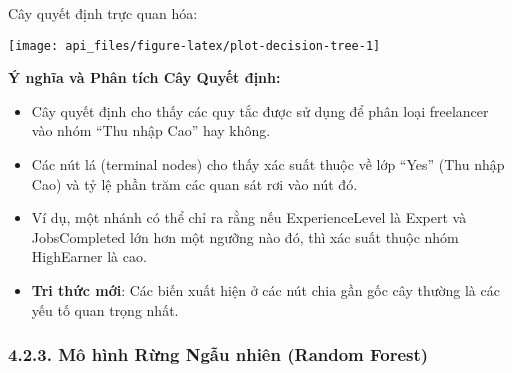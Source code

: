 \documentclass[
]{article}
\newenvironment{Shaded}{\begin{snugshade}}{\end{snugshade}}
\newcommand{\AttributeTok}[1]{\textcolor[rgb]{0.13,0.29,0.53}{#1}}
\newcommand{\CommentTok}[1]{\textcolor[rgb]{0.56,0.35,0.01}{\textit{#1}}}
\newcommand{\ConstantTok}[1]{\textcolor[rgb]{0.56,0.35,0.01}{#1}}
\newcommand{\DecValTok}[1]{\textcolor[rgb]{0.00,0.00,0.81}{#1}}
\newcommand{\FloatTok}[1]{\textcolor[rgb]{0.00,0.00,0.81}{#1}}
\newcommand{\FunctionTok}[1]{\textcolor[rgb]{0.13,0.29,0.53}{\textbf{#1}}}
\newcommand{\NormalTok}[1]{#1}
\newcommand{\SpecialCharTok}[1]{\textcolor[rgb]{0.81,0.36,0.00}{\textbf{#1}}}
\newcommand{\StringTok}[1]{\textcolor[rgb]{0.31,0.60,0.02}{#1}}
\begin{document}
Cây quyết định trực quan hóa:

\begin{Shaded}
\end{Shaded}

\begin{center}\texttt{[image: api\_files/figure-latex/plot-decision-tree-1]} \end{center}

\textbf{Ý nghĩa và Phân tích Cây Quyết định:}

\begin{itemize}
\item
  Cây quyết định cho thấy các quy tắc được sử dụng để phân loại
  freelancer vào nhóm ``Thu nhập Cao'' hay không.
\item
  Các nút lá (terminal nodes) cho thấy xác suất thuộc về lớp ``Yes''
  (Thu nhập Cao) và tỷ lệ phần trăm các quan sát rơi vào nút đó.
\item
  Ví dụ, một nhánh có thể chỉ ra rằng nếu ExperienceLevel là Expert và
  JobsCompleted lớn hơn một ngưỡng nào đó, thì xác suất thuộc nhóm
  HighEarner là cao.
\item
  \textbf{Tri thức mới}: Các biến xuất hiện ở các nút chia gần gốc cây
  thường là các yếu tố quan trọng nhất.
\end{itemize}

\subsubsection{4.2.3. Mô hình Rừng Ngẫu nhiên (Random
Forest)}\label{muxf4-huxecnh-rux1eebng-ngux1eabu-nhiuxean-random-forest}
\end{document}
